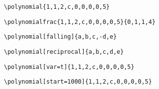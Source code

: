 \begin{center}
\begin{minipage}{.7\textwidth}
\begin{verbatim}
\polynomial{1,1,2,c,0,0,0,0,5}
\end{verbatim}
\end{minipage}
\begin{minipage}{.2\textwidth}
\end{minipage}
\begin{minipage}{.7\textwidth}
\begin{verbatim}
\polynomialfrac{1,1,2,c,0,0,0,0,5}{0,1,1,4}
\end{verbatim}
\end{minipage}
\begin{minipage}{.2\textwidth}
\end{minipage}
\begin{minipage}{.7\textwidth}
\begin{verbatim}	
\polynomial[falling]{a,b,c,-d,e}
\end{verbatim}
\end{minipage}
\begin{minipage}{.2\textwidth}\vspace{-.1cm}
\end{minipage}
\begin{minipage}{.6\textwidth}
\begin{verbatim}
\polynomial[reciprocal]{a,b,c,d,e}
\end{verbatim}
\end{minipage}
\begin{minipage}{.3\textwidth}
\end{minipage}
\begin{minipage}{.7\textwidth}
\begin{verbatim}
\polynomial[var=t]{1,1,2,c,0,0,0,0,5}
\end{verbatim}
\end{minipage}
\begin{minipage}{.2\textwidth}
\end{minipage}
\begin{minipage}{.6\textwidth}
\begin{verbatim}
\polynomial[start=1000]{1,1,2,c,0,0,0,0,5}

\end{verbatim}
\end{minipage}
\end{center}
